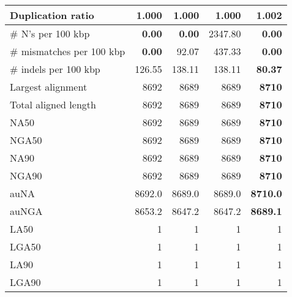 \documentclass[12pt,a4paper]{article}
\begin{document}
\begin{table}[ht]
\begin{center}
\begin{tabular}{|l*{4}{|r}|}
Duplication ratio & {\bf 1.000} & {\bf 1.000} & {\bf 1.000} & 1.002 \\ \hline
\# N's per 100 kbp & {\bf 0.00} & {\bf 0.00} & 2347.80 & {\bf 0.00} \\ \hline
\# mismatches per 100 kbp & {\bf 0.00} & 92.07 & 437.33 & {\bf 0.00} \\ \hline
\# indels per 100 kbp & 126.55 & 138.11 & 138.11 & {\bf 80.37} \\ \hline
Largest alignment & 8692 & 8689 & 8689 & {\bf 8710} \\ \hline
Total aligned length & 8692 & 8689 & 8689 & {\bf 8710} \\ \hline
NA50 & 8692 & 8689 & 8689 & {\bf 8710} \\ \hline
NGA50 & 8692 & 8689 & 8689 & {\bf 8710} \\ \hline
NA90 & 8692 & 8689 & 8689 & {\bf 8710} \\ \hline
NGA90 & 8692 & 8689 & 8689 & {\bf 8710} \\ \hline
auNA & 8692.0 & 8689.0 & 8689.0 & {\bf 8710.0} \\ \hline
auNGA & 8653.2 & 8647.2 & 8647.2 & {\bf 8689.1} \\ \hline
LA50 & 1 & 1 & 1 & 1 \\ \hline
LGA50 & 1 & 1 & 1 & 1 \\ \hline
LA90 & 1 & 1 & 1 & 1 \\ \hline
LGA90 & 1 & 1 & 1 & 1 \\ \hline
\end{tabular}
\end{center}
\end{table}
\end{document}
